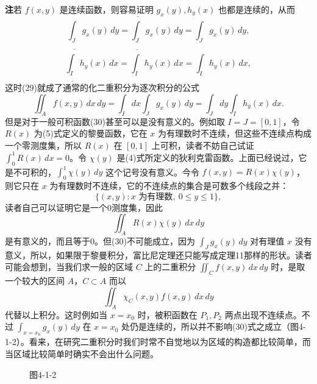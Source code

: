 \noindent\textbf{注}\quad 若 $f(x,y)$ 是连续函数，则容易证明 $g_x(y),h_y(x)$ 也都是连续的，从而
\[
 \underline{\int_J}g_x(y)\,dy=\overline{\int_J}g_x(y)\,dy=\int_Jg_x(y)\,dy,
\]
\[
 \underline{\int_I}h_y(x)\,dx=\overline{\int_I}h_y(x)\,dx=\int_Ih_y(x)\,dx,
\]
这时(29)就成了通常的化二重积分为逐次积分的公式
\begin{equation}
 \iint_A f(x,y)\,dx\,dy=\int_I dx\int_Jg_x(y)\,dy
 =\int_Jdy\int_Ih_y(x)\,dx.
 \tag{30}
\end{equation}
但是对于一般可积函数(30)甚至可以是没有意义的。例如取 $I=J=[0,1]$，令 $R(x)$ 为(5)式定义的黎曼函数，它在 $x$ 为有理数时不连续，但这些不连续点构成一个零测度集，所以 $R(x)$ 在 $[0,1]$ 上可积，读者不妨自己试证 $\int_0^1R(x)\,dx=0$。令 $\chi(y)$ 是(4)式所定义的狄利克雷函数。上面已经说过，它是不可积的，$\int_0^1\chi(y)\,dy$ 这个记号没有意义。今令 $f(x,y)=R(x)\chi(y)$，则它只在 $x$ 为有理数时不连续，它的不连续点的集合是可数多个线段之并：
\[
 \{(x,y):x\text{ 为有理数},\ 0\le y\le1\},
\]
读者自己可以证明它是一个0测度集，因此
\[
 \iint_A R(x)\chi(y)\,dx\,dy
\]
是有意义的，而且等于0。但(30)不可能成立，因为 $\int_Jg_x(y)\,dy$ 对有理值 $x$ 没有意义，所以，如果限于黎曼积分，富比尼定理还只能写成定理11那样的形状。读者可能会想到，当我们求一般的区域 $C$ 上的二重积分 $\iint_Cf(x,y)\,dx\,dy$ 时，是取一个较大的区间 $A$，$C\subset A$ 而以
\[
 \iint_A\chi_C(x,y)f(x,y)\,dx\,dy
\]
代替以上积分。这时例如当 $x=x_0$ 时，被积函数在 $P_1,P_2$ 两点出现不连续点。不过 $\int_{x=x_0}g_x(y)\,dy$ 在 $x=x_0$ 处仍是连续的，所以并不影响(30)式之成立（图4-1-2）。看来，在研究二重积分时我们时常不自觉地以为区域的构造都比较简单，而当区域比较简单时确实不会出什么问题。

\begin{figure}[htbp]
\centering
{}
\caption*{图4-1-2}
\end{figure}

